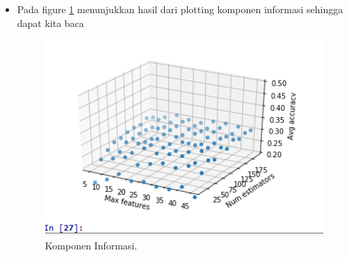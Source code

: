 \begin{enumerate}
\begin{itemize}
\item Pada figure \ref{YNS82} menunjukkan hasil dari plotting komponen informasi sehingga dapat kita baca

	\begin{figure}[ht]
	\centerline{\includegraphics[width=1\textwidth]{figures/YN/Chapter3/No8/YNS82.png}}
	\caption{Komponen Informasi.}
	\label{YNS82}
	\end{figure}
	
	\end{itemize}

\end{enumerate}

